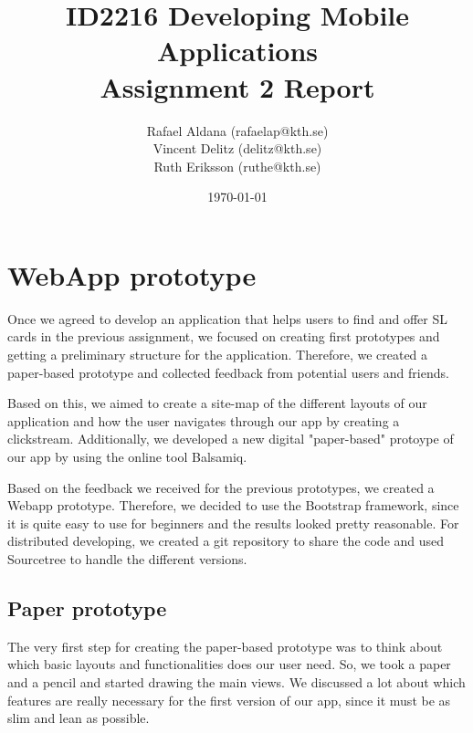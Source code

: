 \documentclass[11pt,twoside,a4paper]{report}
\begin{document}
\title{ID2216 Developing Mobile Applications\\Assignment 2 Report}
\author{Rafael Aldana (rafaelap@kth.se)\\Vincent Delitz (delitz@kth.se)\\Ruth Eriksson (ruthe@kth.se)}
\date{\today}
\maketitle


\tableofcontents
\thispagestyle{empty}



\setcounter{page}{1}
\renewcommand{\chaptername}{Assignment}
\setcounter{chapter}{1}
\chapter{WebApp prototype}

Once we agreed to develop an application that helps users to find and offer SL cards in the previous assignment, we focused on creating first prototypes and getting a preliminary structure for the application. Therefore, we created a paper-based prototype and collected feedback from potential users and friends.

Based on this, we aimed to create a site-map of the different layouts of our application and how the user navigates through our app by creating a clickstream. Additionally, we developed a new digital "paper-based" protoype of our app by using the online tool Balsamiq.

Based on the feedback we received for the previous prototypes, we created a Webapp prototype. Therefore, we decided to use the Bootstrap framework, since it is quite easy to use for beginners and the results looked pretty reasonable. For distributed developing, we created a git repository to share the code and used Sourcetree to handle the different versions.

\section{Paper prototype}

The very first step for creating the paper-based prototype was to think about which basic layouts and functionalities does our user need. So, we took a paper and a pencil and started drawing the main views. We discussed a lot about which features are really necessary for the first version of our app, since it must be as slim and lean as possible.
\end{document}
